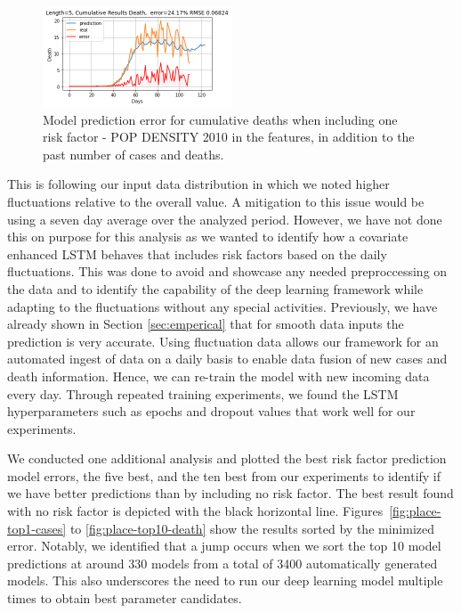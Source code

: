 \documentclass[letterpaper, inpress]{jds} %
\renewcommand{\_}{%
    \textunderscore\hspace{0pt}%
}
\begin{document}
\begin{figure}[!h]    
    \centering
    \includegraphics[width=0.5\textwidth]{images/predict/Length_5-fields_pop_density_2010-Cumulative-Death.png}
    \caption{Model prediction error for cumulative deaths when
      including one risk factor - POP\_DENSITY\_2010 in the features,
      in addition to the past number of cases and deaths.}
    \label{fig:error-death-popdensity}
\end{figure}


This is following our input data distribution in which we noted higher
fluctuations relative to the overall value. A mitigation to this issue
would be using a seven day average over the analyzed period. However,
we have not done this on purpose for this analysis as we wanted to
identify how a covariate enhanced LSTM behaves that includes risk
factors based on the daily fluctuations. This was done to avoid and
showcase any needed preproccessing on the data and to identify the
capability of the deep learning framework while adapting to the
fluctuations without any special activities. Previously, we have
already shown in Section \ref{sec:emperical} that for smooth data
inputs the prediction is very accurate.  Using fluctuation data allows
our framework for an automated ingest of data on a daily basis to
enable data fusion of new cases and death information. Hence, we can
re-train the model with new incoming data every day. Through repeated
training experiments, we found the LSTM hyperparameters such as epochs
and dropout values that work well for our experiments.

We conducted one additional analysis and plotted the best risk factor
prediction model errors, the five best, and the ten best from our
experiments to identify if we have better predictions than by
including no risk factor. The best result found with no risk factor is
depicted with the black horizontal
line. Figures~\ref{fig:place-top1-cases} to
\ref{fig:place-top10-death} show the results sorted by the minimized
error. Notably, we identified that a jump occurs when we sort the top
10 model predictions at around 330 models from a total of 3400
automatically generated models. This also underscores the need to run
our deep learning model multiple times to obtain best parameter
candidates.
\end{document}
